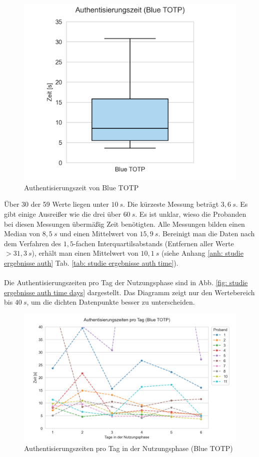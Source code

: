 \begin{figure}
\begin{minipage}[t]{.48\textwidth}
        \includegraphics[width=1.2\linewidth]{data_processing/timings/results/totp_timings_boxplot.png}
        \caption[Authentisierungszeit von Blue TOTP]{Authentisierungszeit von Blue TOTP}
        \label{fig: studie ergebnisse auth time boxplot}
    \end{minipage}
\end{figure}
Über 30 der 59 Werte liegen unter $10~s$. Die kürzeste Messung beträgt $3{,}6~s$. Es gibt einige Ausreißer wie die drei über 
$60~s$. Es ist unklar, wieso die Probanden bei diesen Messungen übermäßig Zeit 
benötigten. Alle Messungen bilden einen Median von $8{,}5~s$ und einen Mittelwert von 
$15{,}9~s$. Bereinigt man die Daten nach dem Verfahren des $1{,}5$-fachen 
Interquartilsabstands (Entfernen aller Werte $> 31{,}3~s$), erhält man einen 
Mittelwert von $10,1~s$ (siehe Anhang \ref{anh: studie ergebnisse auth} Tab. \ref{tab: 
studie ergebnisse auth time}).
\\\\
Die Authentisierungszeiten pro Tag der Nutzungsphase sind in Abb. \ref{fig: studie 
ergebnisse auth time days} dargestellt. Das Diagramm zeigt nur den Wertebereich bis 
$40~s$, um die dichten Datenpunkte besser zu unterscheiden.
\begin{figure}
    \centering
    \includegraphics[width=0.85\linewidth]{data_processing/timings/results/totp_timings_lineplot.png}
    \caption[Authentisierungszeiten pro Tag in der Nutzungsphase (Blue TOTP)]{Authentisierungszeiten pro Tag in der Nutzungsphase (Blue TOTP)}
    \label{fig: studie ergebnisse auth time days}
\end{figure}
